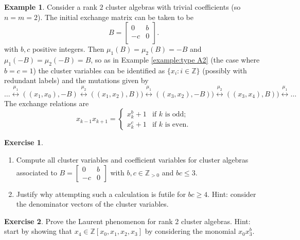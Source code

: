 \documentclass{amsart}
\theoremstyle{definition}
\newtheorem{example}[theorem]{Example}
\newtheorem{subexercise}{Exercise}[theorem]
\theoremstyle{remark}
\numberwithin{equation}{section}
\newcommand{\ZZ}{{\mathbb{Z}}}
\begin{document}
	\begin{example} \label{example:rank2}
		Consider a rank $2$ cluster algebras with trivial coefficients (so $n=m=2$).  The initial exchange matrix can be taken to be
		\begin{displaymath}
			B = \left[ \begin{array}{cc} 	0 & b \\	-c & 0 \\	\end{array}	\right].
		\end{displaymath}
		with $b,c$ positive integers.  Then $\mu_1(B) = \mu_2(B) = -B$ and $\mu_1(-B) = \mu_2(-B) = B$, so as in Example \ref{example:type A2} (the case where $b=c=1$) the cluster variables can be identified as $\{x_i : i \in \mathbb{Z}\}$ (possibly with redundant labels) and the mutations given by 
		\begin{displaymath}
		\ldots \stackrel{\mu_1}{\longleftrightarrow} ((x_1,x_0),-B) \stackrel{\mu_2}{\longleftrightarrow} ((x_1,x_2),B)) \stackrel{\mu_1}{\longleftrightarrow} ((x_3,x_2),-B)) \stackrel{\mu_2}{\longleftrightarrow} ((x_3,x_4),B)) \stackrel{\mu_1}{\longleftrightarrow} \ldots
		\end{displaymath}
		The exchange relations are
		\begin{displaymath}
		x_{k-1}x_{k+1}=\begin{cases}x_k^b+1 & \text{if $k$ is odd;}\\ x_k^c+1 & \text{if $k$ is even.}\end{cases}
		\end{displaymath}
		
		\begin{subexercise}\label{exercise:rank 2}\mbox{}
    \begin{enumerate}
      \item Compute all cluster variables and coefficient variables for cluster algebras associated to $B=\left[\begin{array}{cc} 0 & b\\ -c & 0\end{array}\right]$ with $b,c\in\ZZ_{>0}$ and $bc\le 3$.
      \item Justify why attempting such a calculation is futile for $bc\ge4$.  Hint: consider the denominator vectors of the cluster variables.
    \end{enumerate}
  \end{subexercise}
	
	\begin{subexercise}\label{exercise:rank 2 Laurent phenomenon}
    Prove the Laurent phenomenon for rank 2 cluster algebras.  Hint: start by showing that $x_4\in\ZZ[x_0,x_1,x_2,x_3]$ by considering the monomial $x_0x_3^b$.
  \end{subexercise}
	\end{example}
	
\end{document}
